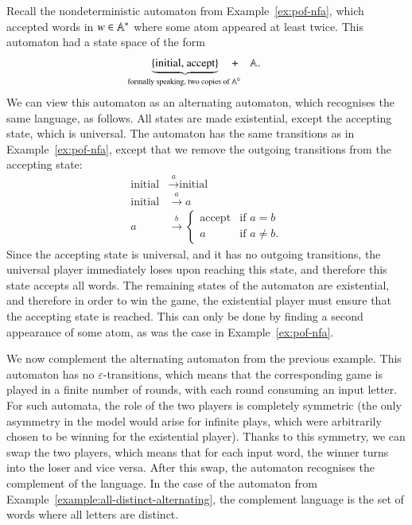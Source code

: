 \begin{myexample}
	 \label{example:twice-alternating}  Recall the nondeterministic automaton from Example~\ref{ex:pof-nfa}, which accepted words in $w \in \mathbb A^*$ where some atom appeared at least twice. This automaton had a state space of the form 
        \begin{align*}
            \myunderbrace{\set{\text{initial, accept}}}{formally speaking, two copies of $\atoms^0$}
            \quad + \quad 
            \atoms.
        \end{align*}
	We can view this automaton as an alternating automaton, which recognises the same language, as follows. All states are made  existential, except the accepting state, which is universal. The automaton has the same  transitions as in Example~\ref{ex:pof-nfa}, except that we remove the outgoing transitions from the accepting state: 
	        \begin{align*}
        \text{initial} & \stackrel a \to \text{initial}\\
        \text{initial} & \stackrel a \to a \\
        a & \stackrel b  \to 
        \begin{cases}
            \text{accept} & \text{if $a = b$} \\
             a & \text{if $a \neq b$}.
        \end{cases}
        \end{align*}
	Since the accepting state is universal, and it has no outgoing transitions, the universal player immediately loses upon reaching this state, and therefore this state accepts all words. The remaining states of the automaton are existential, and therefore in order to win the game, the existential player must ensure that the accepting state is reached. This can only be done by finding a second appearance of some atom, as was the case in Example~\ref{ex:pof-nfa}.
\end{myexample}

\begin{myexample}
	 \label{example:all-distinct-alternating} We now complement the alternating automaton from the previous example. This automaton has no $\varepsilon$-transitions, which means that the corresponding game is played in a finite number of rounds, with each round consuming an input letter. For such automata, the role of the two players is completely symmetric (the only asymmetry in the model would arise for infinite plays, which were arbitrarily chosen to be winning for the existential player). Thanks to this symmetry, we can swap the two players, which means that for each input word, the winner turns into the loser and vice versa. After this swap, the automaton recognises the complement of the language. In the case of the automaton from Example~\ref{example:all-distinct-alternating}, the complement language is the set of words where all letters are distinct.
\end{myexample}

